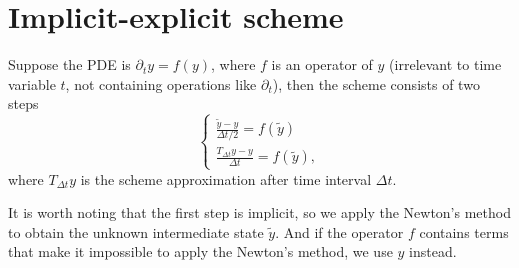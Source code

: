\documentclass{article}
\begin{document}
  \section{Implicit-explicit scheme}
  Suppose the PDE is $\partial_t y = f(y)$, where $f$ is an operator of $y$ (irrelevant to time
  variable $t$, not containing operations like $\partial_t$), then the scheme consists of two steps
  \[
    \left\{
      \begin{aligned}
        \frac{\tilde y - y}{\Delta t / 2} = f(\tilde y)\\
        \frac{T_{\Delta t}y - y}{\Delta t} = f(\tilde y),
      \end{aligned}
    \right.
  \]
  where $T_{\Delta t}y$ is the scheme approximation after time interval $\Delta t$.

  It is worth noting that the first step is implicit, so we apply the Newton's method to obtain
  the unknown intermediate state $\tilde y$. And if the operator $f$ contains terms that make
  it impossible to apply the Newton's method, we use $y$ instead.
\end{document}
